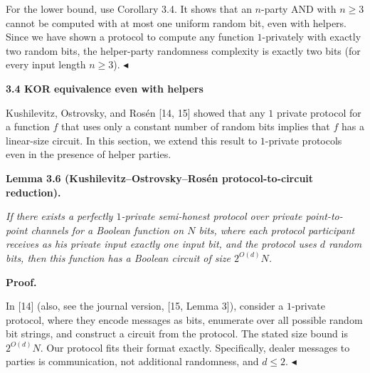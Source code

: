 For the lower bound, use Corollary 3.4. It shows that an $n$-party AND with $n\geq 3$ cannot be computed with at most one uniform random bit, even with helpers. Since we have shown a protocol to compute any function $1$-privately with exactly two random bits, the helper-party randomness complexity is exactly two bits (for every input length $n\geq 3$).
$\blacktriangleleft$\par






\par\medskip\noindent\textbf{
3.4 KOR equivalence even with helpers}\par




Kushilevitz, Ostrovsky, and Rosén [14, 15] showed that any $1$ private protocol for a function $f$ that uses only a constant number of random bits implies that $f$ has a linear-size circuit. In this section, we extend this result to $1$-private protocols even in the presence of helper parties.\par





\par\medskip\noindent\textbf{
\textbf{Lemma 3.6}\textbf{ }(Kushilevitz–Ostrovsky–Rosén protocol-to-circuit reduction)\textbf{.}
}\par



\emph{If there exists a perfectly $1$-private semi-honest protocol over private point-to-point channels for a Boolean function on $N$ bits, where each protocol participant receives as his private input exactly one input bit, and the protocol uses $d$ random bits, then this function has a Boolean circuit of size $2^{O(d)}N$.}\par






\par\medskip\noindent\textbf{Proof.}\par




In [14] (also, see the journal version, [15, Lemma 3]), consider a $1$-private protocol, where they encode messages as bits, enumerate over all possible random bit strings, and construct a circuit from the protocol. The stated size bound is $2^{O(d)}N$. Our protocol fits their format exactly. Specifically, dealer messages to parties is communication, not additional randomness, and $d\leq 2$.
$\blacktriangleleft$\par





